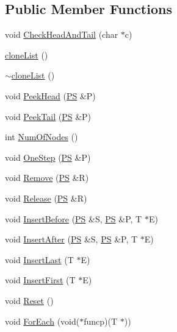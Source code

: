 \subsection*{Public Member Functions}
\begin{DoxyCompactItemize}
\item 
void \hyperlink{classclone_list_aaa28fe3ad846446120b27a1928dd406b}{CheckHeadAndTail} (char $\ast$c)
\item 
\hyperlink{classclone_list_a4734bf21bc044a2e277d51c6b12f605a}{cloneList} ()
\item 
\hyperlink{classclone_list_a4b1c911fa45b3525ecbaa754fb0c6e48}{$\sim$cloneList} ()
\item 
void \hyperlink{classclone_list_a2780cfb6574e5cd9b8797b1b5c8c9ad6}{PeekHead} (\hyperlink{structclone_list_1_1_snode}{PS} \&P)
\item 
void \hyperlink{classclone_list_a5c93719d6da05ac5249e8535c5c644d8}{PeekTail} (\hyperlink{structclone_list_1_1_snode}{PS} \&P)
\item 
int \hyperlink{classclone_list_a8f54a13007e33d1a1f08f77a0bd70927}{NumOfNodes} ()
\item 
void \hyperlink{classclone_list_a2e89afbba3e4eb248912cc2bd1830e7f}{OneStep} (\hyperlink{structclone_list_1_1_snode}{PS} \&P)
\item 
void \hyperlink{classclone_list_adbe44f675a57126b264432f5eda3f5fb}{Remove} (\hyperlink{structclone_list_1_1_snode}{PS} \&R)
\item 
void \hyperlink{classclone_list_a9dd071686629c50a473d691f2de1e0a2}{Release} (\hyperlink{structclone_list_1_1_snode}{PS} \&R)
\item 
void \hyperlink{classclone_list_a06a7e1332f87a0ace2d6b4293ba9f152}{InsertBefore} (\hyperlink{structclone_list_1_1_snode}{PS} \&S, \hyperlink{structclone_list_1_1_snode}{PS} \&P, T $\ast$E)
\item 
void \hyperlink{classclone_list_aa6c5dda0ddabd776d8aa4cf115a338e4}{InsertAfter} (\hyperlink{structclone_list_1_1_snode}{PS} \&S, \hyperlink{structclone_list_1_1_snode}{PS} \&P, T $\ast$E)
\item 
void \hyperlink{classclone_list_a14b4adf5b6e8ca8e6d262afcdb3cc42b}{InsertLast} (T $\ast$E)
\item 
void \hyperlink{classclone_list_a56a0c2c564dd251e6f9db7061370e1dc}{InsertFirst} (T $\ast$E)
\item 
void \hyperlink{classclone_list_a7f47b063b2357a0b391da5ecc9745524}{Reset} ()
\item 
void \hyperlink{classclone_list_ac4911df1517c594f4e0537f62f2751bc}{ForEach} (void($\ast$funcp)(T $\ast$))

\end{DoxyCompactItemize}
